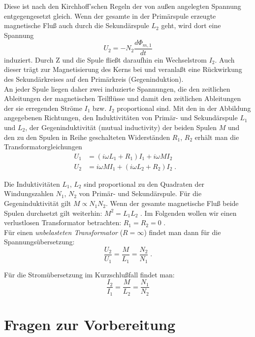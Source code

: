 \noindent
Diese ist nach den Kirchhoff'schen Regeln der von außen angelegten Spannung entgegengesetzt gleich. Wenn der gesamte in der Primärspule erzeugte magnetische Fluß auch durch die Sekundärspule $L_2$ geht, wird dort eine Spannung
\begin{equation}
U_2 = -N_2\frac{d\Phi_{m,1}}{dt}
\end{equation}
induziert. Durch Z und die Spule fließt daraufhin ein Wechselstrom $I_2$. Auch dieser trägt zur Magnetisierung des Kerns bei und veranlaßt eine Rückwirkung des Sekundärkreises auf den Primärkreis (Gegeninduktion).\\
An jeder Spule liegen daher zwei induzierte Spannungen, die den zeitlichen Ableitungen der magnetischen Teilflüsse und damit den zeitlichen Ableitungen der sie erregenden Ströme $I_1$ bzw. $I_2$ proportional sind. Mit den in der Abbildung angegebenen Richtungen, den Induktivitäten von Primär- und Sekundärspule $L_1$und $L_2$, der Gegeninduktivität (mutual inductivity) der beiden Spulen $M$ und den zu den Spulen in Reihe geschalteten Widerständen $R_1$, $R_2$ erhält man die Transformatorgleichungen
\begin{align*}
U_1 & = (i\omega L_1 + R_1) I_1 + i\omega M I_2 &\\
U_2 & = i\omega M I_1 + (i\omega L_2 + R_2) I_2 \; .
\end{align*}

Die Induktivitäten $L_1$, $L_2$ sind proportional zu den Quadraten der Windungszahlen $N_1$, $N_2$ von Primär- und Sekundärspule. Für die Gegeninduktivität gilt $M\propto N_1N_2$. Wenn der gesamte magnetische Fluß beide Spulen durchsetzt gilt weiterhin: $M^2 = L_1L_2$\; . Im Folgenden wollen wir einen verlustlosen Transformator betrachten: $R_1 = R_2 = 0$\; .\\
Für einen \textit{unbelasteten Transformator} ($R = \infty$) findet man dann für die Spannungsübersetzung:
\begin{equation} \label{eq:Spannungsuebersetzung}
\frac{U_2}{U_1} = \frac{M}{L_1} = \frac{N_2}{N_1}\; .
\end{equation}

\noindent
Für die Stromübersetzung im Kurzschlußfall findet man:
\begin{equation} \label{eq:Stromuebersetzung}
\frac{I_2}{I_1} = \frac{M}{L_2} = \frac{N_1}{N_2}
\end{equation}
\section{Fragen zur Vorbereitung}

